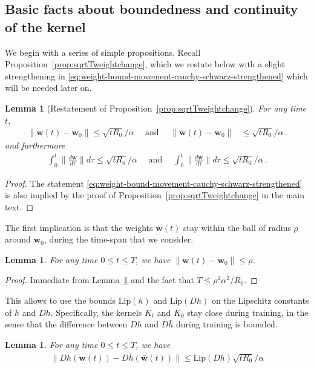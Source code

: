 \documentclass[11pt]{article} %
\newcommand{\<}{\langle}
\renewcommand{\>}{\rangle}
\def\bw{{\boldsymbol w}}
\def\barbw{\bar{\bw}}
\newcommand{\Lip}{\mathrm{Lip}}
\theoremstyle{plain}
\newtheorem{lemma}[theorem]{Lemma}
\theoremstyle{definition}
\theoremstyle{remark}
\begin{document}
\subsection{Basic facts about boundedness and continuity of the kernel}
We begin with a series of simple propositions. Recall Proposition~\ref{prop:sqrtTweightchange}, which we restate below with a slight strengthening in \eqref{eq:weight-bound-movement-cauchy-schwarz-strengthened} which will be needed later on.
\begin{lemma}[Restatement of Proposition~\ref{prop:sqrtTweightchange}]\label{lem:sqrtTweightchange-restated} For any time $t$,
\begin{align*}
\|\bw(t) - \bw_0\| \leq \sqrt{tR_0} / \alpha \quad \mbox{ and } \quad \|\bar\bw(t) - \bw_0\| &\leq \sqrt{tR_0} /\alpha\,.
\end{align*}
and furthermore
\begin{align}\label{eq:weight-bound-movement-cauchy-schwarz-strengthened}
\int_{0}^t \|\frac{d\bw}{d\tau}\| d\tau \leq \sqrt{t R_0} / \alpha \quad \mbox{ and } \quad \int_{0}^t \|\frac{d\bar\bw}{d\tau}\| d\tau \leq \sqrt{t R_0} / \alpha\,.\end{align}
\end{lemma}
\begin{proof}
The statement \eqref{eq:weight-bound-movement-cauchy-schwarz-strengthened} is also implied by the proof of Proposition~\ref{prop:sqrtTweightchange} in the main text.
\end{proof}
 The first implication is that the weights $\bw(t)$ stay within the ball of radius $\rho$ around $\bw_0$, during the time-span that we consider.
\begin{lemma}\label{lem:weights-ball-r}
For any time $0 \leq t \leq T$, we have $\|\bw(t) - \bw_0\| \leq \rho$.
\end{lemma}
\begin{proof}
Immediate from Lemma~\ref{lem:sqrtTweightchange-restated} and the fact that $T \leq \rho^2 \alpha^2 / R_0$.
\end{proof}
This allows to use the bounds $\mathrm{Lip}(h)$ and $\mathrm{Lip}(Dh)$ on the Lipschitz constants of $h$ and $Dh$. Specifically, the kernels $K_t$ and $K_0$ stay close during training, in the sense that the difference between $Dh$ and $D\bar{h}$ during training is bounded.
\begin{lemma}\label{lem:Dhclose}
For any time $0 \leq t \leq T$, we have
\begin{align*}
\|Dh(\bw(t)) - D\bar{h}(\barbw(t))\| \leq \Lip(Dh) \sqrt{t R_0} / \alpha
\end{align*}
\end{lemma}
\end{document}
